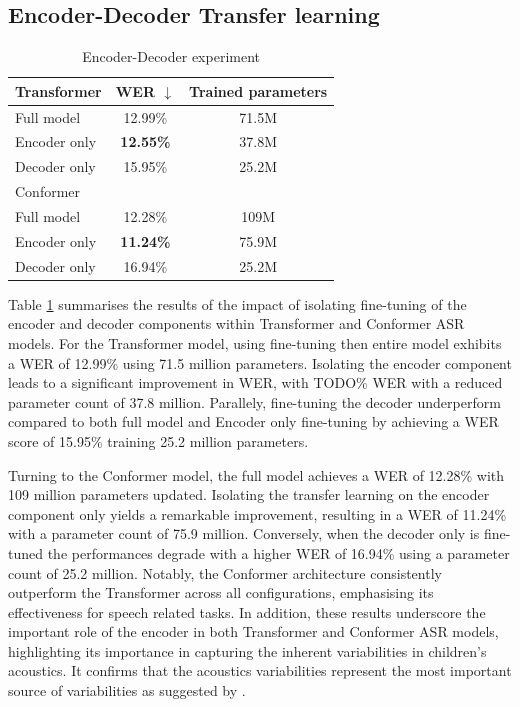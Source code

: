 \subsection{Encoder-Decoder Transfer learning}
\begin{table}
    \begin{center}
        \begin{tabular}{lcc}\hline
            Transformer    &   WER $\downarrow$    & Trained parameters  \\ \hline
            Full model          & 12.99\% & 71.5M   \\
            Encoder only & \textbf{12.55\%} & 37.8M  \\
            Decoder only & 15.95\% & 25.2M  \\ \hline \hline
            Conformer    &    & \\ \hline
            Full model          & 12.28\% & 109M   \\
            Encoder only & \textbf{11.24\%} & 75.9M  \\
            Decoder only & 16.94\% & 25.2M  \\ \hline 

        \end{tabular}
    \end{center}
    \caption{Encoder-Decoder experiment}
    \label{tab:EncoderDecoder}
\end{table}
Table \ref{tab:EncoderDecoder} summarises the results of the impact of isolating fine-tuning of the encoder and decoder components within Transformer and Conformer ASR models. For the Transformer model, using fine-tuning then entire model exhibits a WER of 12.99\% using 71.5 million parameters. Isolating the encoder component leads to a significant improvement in WER, with TODO\% WER with a reduced parameter count of 37.8 million. Parallely, fine-tuning the decoder underperform compared to both full model and Encoder only fine-tuning by achieving a WER score of 15.95\% training 25.2 million parameters. 

Turning to the Conformer model, the full model achieves a WER of 12.28\% with 109 million parameters updated. Isolating the transfer learning on the encoder component only  yields a remarkable improvement, resulting in a WER of 11.24\% with a parameter count of 75.9 million. Conversely, when the decoder only is fine-tuned the performances degrade with a higher WER of 16.94\% using a parameter count of 25.2 million. Notably, the Conformer architecture consistently outperform the Transformer across all configurations, emphasising its effectiveness for speech related tasks. In addition, these results underscore the important role of the encoder in both Transformer and Conformer ASR models, highlighting its importance in capturing the inherent variabilities in children's acoustics. It confirms that the acoustics variabilities represent the most important source of variabilities as suggested by \cite{TFchildren}.

